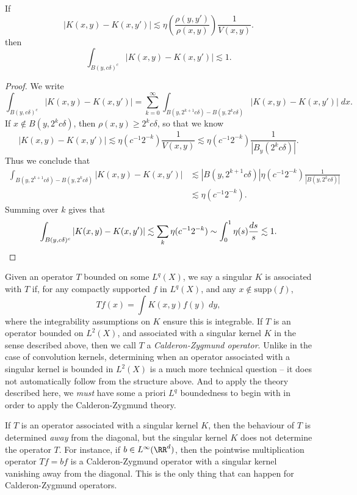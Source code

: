 \begin{lemma}
    If
    \[ |K(x,y) - K(x,y')| \lesssim \eta \left( \frac{\rho(y,y')}{\rho(x,y)} \right) \frac{1}{V(x,y)}. \]
    then
    \[ \int_{B(y,c\delta)^c} |K(x,y) - K(x,y')| \lesssim 1. \]
\end{lemma}
\begin{proof}
    We write
    \[ \int_{B(y,c\delta)^c} |K(x,y) - K(x,y')| = \sum_{k = 0}^\infty \int_{B(y, 2^{k+1} c \delta ) - B(y, 2^k c \delta)} |K(x,y) - K(x,y')|\; dx. \]
    If $x \not \in B(y,2^k c \delta)$, then $\rho(x,y) \geq 2^k c \delta$, so that we know
    \[ |K(x,y) - K(x,y')| \lesssim \eta \left( c^{-1} 2^{-k} \right) \frac{1}{V(x,y)} \lesssim \eta \left( c^{-1} 2^{-k} \right) \frac{1}{|B_y(2^k c \delta)|}. \]
    Thus we conclude that
    \begin{align*}
        \int_{B(y, 2^{k+1} c \delta) - B(y, 2^k c \delta)} |K(x,y) - K(x,y')| &\lesssim |B(y,2^{k+1} c \delta)| \eta \left( c^{-1} 2^{-k} \right) \frac{1}{|B(y,2^k c \delta)|}\\
        &\lesssim \eta ( c^{-1} 2^{-k} ).
    \end{align*}
    Summing over $k$ gives that
    \[ \int_{B(y,c\delta)^c} |K(x,y) - K(x,y')| \lesssim \sum_k \eta( c^{-1} 2^{-k} ) \sim \int_0^1 \eta(s) \frac{ds}{s} \lesssim 1. \qedhere \]
\end{proof}

Given an operator $T$ bounded on some $L^q(X)$, we say a singular $K$ is associated with $T$ if, for any compactly supported $f$ in $L^q(X)$, and any $x \not \in \text{supp}(f)$,
%
\[ Tf(x) = \int K(x,y) f(y)\; dy, \]
%
where the integrability assumptions on $K$ ensure this is integrable. If $T$ is an operator bounded on $L^2(X)$, and associated with a singular kernel $K$ in the sense described above, then we call $T$ a \emph{Calderon-Zygmund operator}. Unlike in the case of convolution kernels, determining when an operator associated with a singular kernel is bounded in $L^2(X)$ is a much more technical question -- it does not automatically follow from the structure above. And to apply the theory described here, we \emph{must} have some a priori $L^q$ boundedness to begin with in order to apply the Calderon-Zygmund theory.

If $T$ is an operator associated with a singular kernel $K$, then the behaviour of $T$ is determined \emph{away} from the diagonal, but the singular kernel $K$ does not determine the operator $T$. For instance, if $b \in L^\infty(\RR^d)$, then the pointwise multiplication operator $Tf = bf$ is a Calderon-Zygmund operator with a singular kernel vanishing away from the diagonal. This is the only thing that can happen for Calderon-Zygmund operators.

